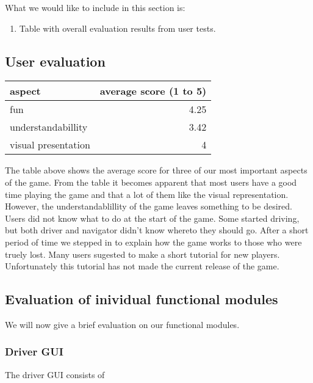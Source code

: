 What we would like to include in this section is:
\begin{enumerate}
	\item Table with overall evaluation results from user tests.
	
\end{enumerate}
\subsection{User evaluation}{
\begin{center}
\begin{tabular}{| l | r |}
	\hline
	aspect & average score (1 to 5) \\ \hline
	fun & 4.25 \\ \hline
	understandabillity & 3.42 \\ \hline
	visual presentation & 4\\ \hline
\end{tabular}
\end{center} 

The table above shows the average score for three of our most important aspects of the game. From the table it becomes apparent that most users have a good time playing the game and that a lot of them like the visual representation. However, the understandablillity of the game leaves something to be desired. Users did not know what to do at the start of the game. Some started driving, but both driver and navigator didn't know whereto they should go. After a short period of time we stepped in to explain how the game works to those who were truely lost. Many users sugested to make a short tutorial for new players. Unfortunately this tutorial has not made the current release of the game.

\subsection{Evaluation of inividual functional modules}

We will now give a brief evaluation on our functional modules.

\subsubsection*{Driver GUI}

The driver GUI consists of 


}
